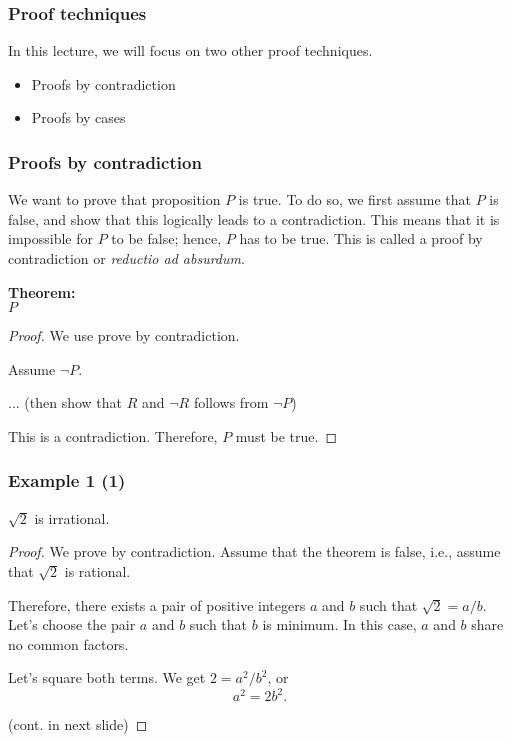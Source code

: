 

\begin{frame}\frametitle{Proof techniques}
  In this lecture, we will focus on two other proof techniques.
  \begin{itemize}
  \item Proofs by contradiction
  \item Proofs by cases
  \end{itemize}
\end{frame}

\begin{frame}\frametitle{Proofs by contradiction}
  We want to prove that proposition $P$ is true.  To do so, we first
  assume that $P$ is false, and show that this logically leads to a
  contradiction.  This means that it is impossible for $P$ to be
  false; hence, $P$ has to be true.  This is called a proof by
  contradiction or {\em reductio ad absurdum}.

  \begin{tcolorbox}[title=Direct proofs]
    {\bf Theorem:} \\
    $P$
    \begin{proof}
      We use prove by contradiction.
      
      Assume $\neg P$.
      
      ... (then show that $R$ and $\neg R$ follows from $\neg P$)

      This is a contradiction. Therefore, $P$ must be true.
    \end{proof}
  \end{tcolorbox}
\end{frame}

\begin{frame}\frametitle{Example 1 (1)}
  \begin{theorem}
    $\sqrt{2}$ is irrational.
  \end{theorem}
  \begin{proof}
    We prove by contradiction.  Assume that the theorem is false,
    i.e., assume that $\sqrt{2}$ is rational. \pause

    Therefore, there exists a pair of positive integers $a$ and $b$
    such that $\sqrt{2} = a/b$.  \pause Let's choose the pair $a$ and
    $b$ such that $b$ is minimum. In this case, $a$ and $b$ share no
    common factors. \pause

    Let's square both terms.  We get $2 = a^2/b^2$, or
    \[ a^2 = 2b^2. \]

    (cont. in next slide)
  \end{proof}
\end{frame}


